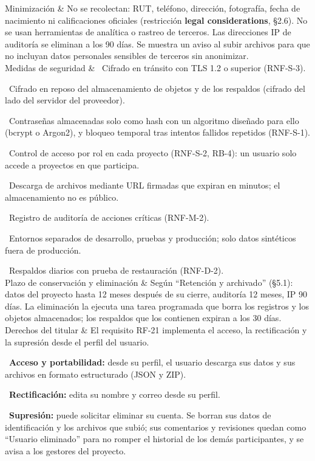 \documentclass[10pt,a4paper]{article}
\newenvironment{kv}[1][4.6cm]
  {\footnotesize\setlength{\extrarowheight}{3pt}\xltabular{\linewidth}{|E{#1}|L|}\hline}
  {\endxltabular}
\newcommand{\kvrow}[2]{#1 & #2 \\ \hline}
\begin{document}
\begin{kv}
\kvrow{Minimización}{No se recolectan: RUT, teléfono, dirección, fotografía, fecha de nacimiento ni calificaciones oficiales (restricción \textbf{legal considerations}, §2.6). No se usan herramientas de analítica o rastreo de terceros. Las direcciones IP de auditoría se eliminan a los 90 días. Se muestra un aviso al subir archivos para que no incluyan datos personales sensibles de terceros sin anonimizar.}
\kvrow{Medidas de seguridad}{%
\textbullet~Cifrado en tránsito con TLS 1.2 o superior (RNF-S-3).\par
\textbullet~Cifrado en reposo del almacenamiento de objetos y de los respaldos (cifrado del lado del servidor del proveedor).\par
\textbullet~Contraseñas almacenadas solo como hash con un algoritmo diseñado para ello (bcrypt o Argon2), y bloqueo temporal tras intentos fallidos repetidos (RNF-S-1).\par
\textbullet~Control de acceso por rol en cada proyecto (RNF-S-2, RB-4): un usuario solo accede a proyectos en que participa.\par
\textbullet~Descarga de archivos mediante URL firmadas que expiran en minutos; el almacenamiento no es público.\par
\textbullet~Registro de auditoría de acciones críticas (RNF-M-2).\par
\textbullet~Entornos separados de desarrollo, pruebas y producción; solo datos sintéticos fuera de producción.\par
\textbullet~Respaldos diarios con prueba de restauración (RNF-D-2).}
\kvrow{Plazo de conservación y eliminación}{Según ``Retención y archivado'' (§5.1): datos del proyecto hasta 12 meses después de su cierre, auditoría 12 meses, IP 90 días. La eliminación la ejecuta una tarea programada que borra los registros y los objetos almacenados; los respaldos que los contienen expiran a los 30 días.}
\kvrow{Derechos del titular}{%
El requisito RF-21 implementa el acceso, la rectificación y la supresión desde el perfil del usuario.\par
\textbullet~\textbf{Acceso y portabilidad:} desde su perfil, el usuario descarga sus datos y sus archivos en formato estructurado (JSON y ZIP).\par
\textbullet~\textbf{Rectificación:} edita su nombre y correo desde su perfil.\par
\textbullet~\textbf{Supresión:} puede solicitar eliminar su cuenta. Se borran sus datos de identificación y los archivos que subió; sus comentarios y revisiones quedan como ``Usuario eliminado'' para no romper el historial de los demás participantes, y se avisa a los gestores del proyecto.\par
}
\end{kv}
\end{document}
